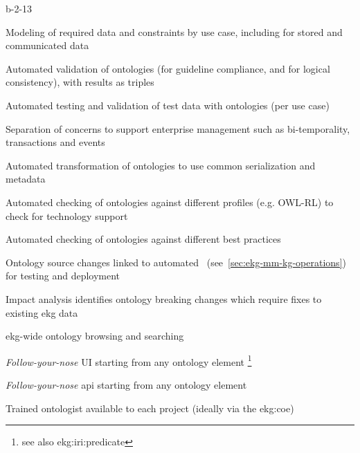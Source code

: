\begin{level-assessment}{b-2-1}{3}

    \item Modeling of required data and constraints by use case, including for stored and communicated data
    \item Automated validation of ontologies (for guideline compliance, and for logical consistency),
          with results as triples
    \item Automated testing and validation of test data with ontologies (per use case)
    \item Separation of concerns to support enterprise management such as
          bi-temporality, transactions and events
    \item Automated transformation of ontologies to use common serialization and metadata
    \item Automated checking of ontologies against different profiles (e.g. OWL-RL)
          to check for technology support
    \item Automated checking of ontologies against different best practices
    \item Ontology source changes linked to automated~
          (see~\ref{sec:ekg-mm-kg-operations}) for testing and deployment
    \item Impact analysis identifies ontology breaking changes which require fixes to existing \gls{ekg} data
    \item \Gls{ekg}-wide ontology browsing and searching
    \item \textit{Follow-your-nose} UI starting from any
          ontology element \footnote{\label{foot:predicate-iri}see also \gls{ekg:iri:predicate}}
    \item \textit{Follow-your-nose} \gls{api} starting from any
          ontology element 
    \item Trained ontologist available to each project (ideally via the \gls{ekg:coe})

\end{level-assessment}

